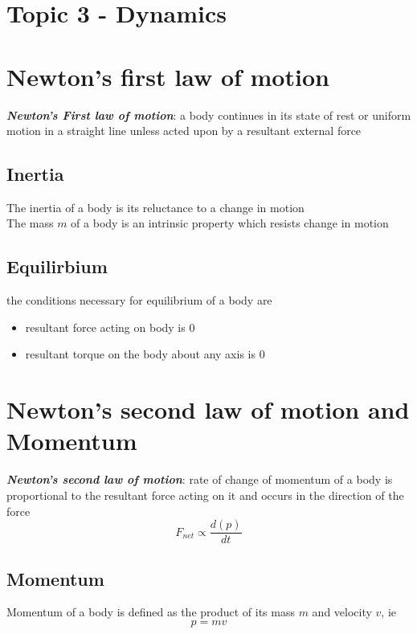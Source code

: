 \documentclass[a4paper, 10pt]{article}
\begin{document}
\section*{Topic 3 - Dynamics}
\section{Newton's first law of motion}

\begin{framed}
   \textbf{\textit{Newton's First law of motion}}: a body continues in its state of rest or uniform motion in a straight line unless acted upon by a resultant external force
\end{framed}	

\subsection{Inertia}
The inertia of a body is its reluctance to a change in motion  \\

The mass $m$ of a body is an intrinsic property which resists change in motion

\subsection{Equilirbium}
the conditions necessary for equilibrium of a body are 
\begin{itemize}
   \item resultant force acting on body is 0
   \item resultant torque on the body about any axis is 0
\end{itemize}	


\section{Newton's second law of motion and Momentum}
\begin{framed}
   \textbf{\textit{Newton's second law of motion}}: rate of change of momentum of a body is proportional to the resultant force acting on it and occurs in the direction of the force
  \[
     F_{net} \propto \frac{d(p)}{dt}
  \]
   
\end{framed}	

\subsection{Momentum}
Momentum of a body is defined as the product of its mass $m$ and velocity $v$, ie 
\[
   p = mv 
\]
\end{document}
